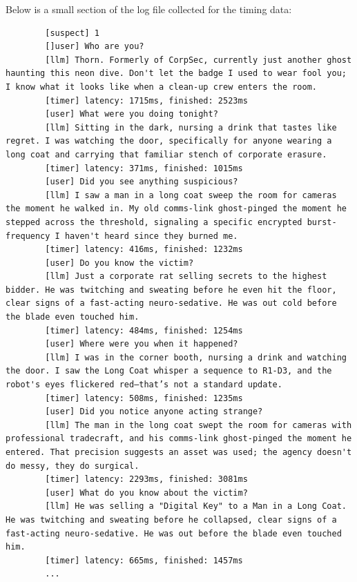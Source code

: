 \documentclass[12pt, a4paper]{report}
\begin{document}
	Below is a small section of the log file collected for the timing data:
	
	\begin{verbatim}
		[suspect] 1                                                                                                                                                                                                                                          
		[]user] Who are you?
		[llm] Thorn. Formerly of CorpSec, currently just another ghost haunting this neon dive. Don't let the badge I used to wear fool you; I know what it looks like when a clean-up crew enters the room.
		[timer] latency: 1715ms, finished: 2523ms
		[user] What were you doing tonight?
		[llm] Sitting in the dark, nursing a drink that tastes like regret. I was watching the door, specifically for anyone wearing a long coat and carrying that familiar stench of corporate erasure.
		[timer] latency: 371ms, finished: 1015ms
		[user] Did you see anything suspicious?
		[llm] I saw a man in a long coat sweep the room for cameras the moment he walked in. My old comms-link ghost-pinged the moment he stepped across the threshold, signaling a specific encrypted burst-frequency I haven't heard since they burned me. 
		[timer] latency: 416ms, finished: 1232ms
		[user] Do you know the victim?
		[llm] Just a corporate rat selling secrets to the highest bidder. He was twitching and sweating before he even hit the floor, clear signs of a fast-acting neuro-sedative. He was out cold before the blade even touched him.
		[timer] latency: 484ms, finished: 1254ms
		[user] Where were you when it happened?
		[llm] I was in the corner booth, nursing a drink and watching the door. I saw the Long Coat whisper a sequence to R1-D3, and the robot's eyes flickered red—that’s not a standard update.
		[timer] latency: 508ms, finished: 1235ms
		[user] Did you notice anyone acting strange?
		[llm] The man in the long coat swept the room for cameras with professional tradecraft, and his comms-link ghost-pinged the moment he entered. That precision suggests an asset was used; the agency doesn't do messy, they do surgical.
		[timer] latency: 2293ms, finished: 3081ms
		[user] What do you know about the victim?
		[llm] He was selling a "Digital Key" to a Man in a Long Coat. He was twitching and sweating before he collapsed, clear signs of a fast-acting neuro-sedative. He was out before the blade even touched him.
		[timer] latency: 665ms, finished: 1457ms
		...
	\end{verbatim}

	\printbibliography[title={References}]
\end{document}
